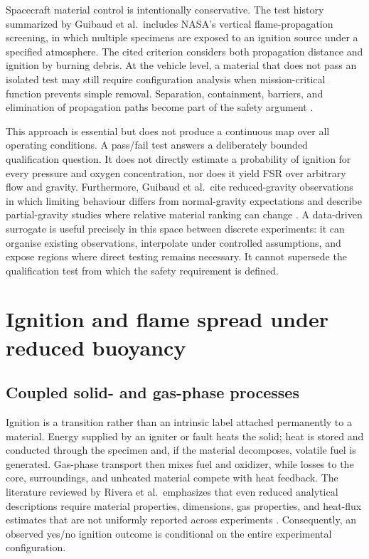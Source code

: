 Spacecraft material control is intentionally conservative. The test history summarized by Guibaud et al.\ includes NASA's vertical flame-propagation screening, in which multiple specimens are exposed to an ignition source under a specified atmosphere. The cited criterion considers both propagation distance and ignition by burning debris. At the vehicle level, a material that does not pass an isolated test may still require configuration analysis when mission-critical function prevents simple removal. Separation, containment, barriers, and elimination of propagation paths become part of the safety argument \cite{guibaud2022spacecraft}.

This approach is essential but does not produce a continuous map over all operating conditions. A pass/fail test answers a deliberately bounded qualification question. It does not directly estimate a probability of ignition for every pressure and oxygen concentration, nor does it yield FSR over arbitrary flow and gravity. Furthermore, Guibaud et al.\ cite reduced-gravity observations in which limiting behaviour differs from normal-gravity expectations and describe partial-gravity studies where relative material ranking can change \cite{guibaud2022spacecraft}. A data-driven surrogate is useful precisely in this space between discrete experiments: it can organise existing observations, interpolate under controlled assumptions, and expose regions where direct testing remains necessary. It cannot supersede the qualification test from which the safety requirement is defined.

\section{Ignition and flame spread under reduced buoyancy}

\subsection{Coupled solid- and gas-phase processes}

Ignition is a transition rather than an intrinsic label attached permanently to a material. Energy supplied by an igniter or fault heats the solid; heat is stored and conducted through the specimen and, if the material decomposes, volatile fuel is generated. Gas-phase transport then mixes fuel and oxidizer, while losses to the core, surroundings, and unheated material compete with heat feedback. The literature reviewed by Rivera et al.\ emphasizes that even reduced analytical descriptions require material properties, dimensions, gas properties, and heat-flux estimates that are not uniformly reported across experiments \cite{riveraWireML}. Consequently, an observed yes/no ignition outcome is conditional on the entire experimental configuration.


